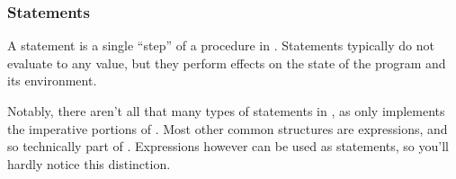 \subsubsection{Statements}

A statement is a single ``step'' of a procedure in \Prose{}. Statements typically do not
evaluate to any value, but they perform effects on the state of the program and its
environment.

Notably, there aren't all that many types of statements in \Prose{}, as \Prose{}
only implements the imperative portions of \Trilogy{}. Most other common structures
are expressions, and so technically part of \Poetry{}. Expressions however can be
used as statements, so you'll hardly notice this distinction.

\begin{bnf*}
     \\
     \\
\end{bnf*}
